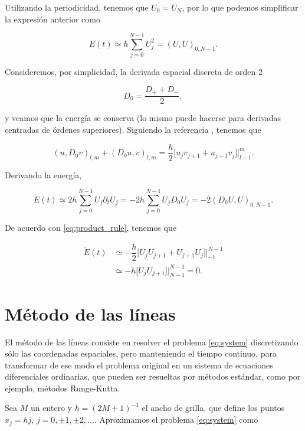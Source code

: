 \documentclass[12pt]{article}
\begin{document}
Utilizando la periodicidad, tenemos que $U_0 = U_N$, por lo que podemos simplificar la expresi\'on anterior como

\begin{equation}
E(t) \simeq h\sum_{j=0}^{N-1} U_j^2 = (U,U)_{0,N-1}.
\end{equation}

Consideremos, por simplicidad, la derivada espacial discreta de orden 2 

\begin{equation}
D_0 = \dfrac{D_+ + D_-}{2},
\end{equation}

y veamos que la energ\'ia se conserva (lo mismo puede hacerse para derivadas centradas de \'ordenes superiores). Siguiendo la referencia \cite{Kreiss-Ortiz}, tenemos que 

\begin{equation} \label{eq:product_rule}
(u, D_0 v)_{l,m} + (D_0 u, v)_{l,m} = \dfrac{h}{2} \bigg[ u_j v_{j+1} + u_{j+1} v_j \bigg]\bigg|_{l-1}^m.
\end{equation}

Derivando la energ\'ia,

\begin{equation}
\dot{E}(t) \simeq 2 h \sum_{j=0}^{N-1} U_j \partial_t U_j = -2 h \sum_{j=0}^{N-1} U_j D_0 U_j = -2 (D_0 U, U)_{0,N-1}.
\end{equation}

De acuerdo con \ref{eq:product_rule}, tenemos que 

\begin{align}
\dot{E}(t) &\simeq -\dfrac{h}{2}  \bigg[ U_j U_{j+1} + U_{j+1} U_j \bigg]\bigg|_{-1}^{N-1} \\
&\simeq -h   \bigg[ U_j U_{j+1}\bigg]\bigg|_{N-1}^{N-1} = 0.
\end{align}

\section{M\'etodo de las l\'ineas}

El m\'etodo de las l\'ineas consiste en resolver el problema \ref{eq:system} discretizando s\'olo las coordenadas espaciales, pero manteniendo el tiempo continuo, para transformar de ese modo el problema original en un sistema de ecuaciones diferenciales ordinarias, que pueden ser resueltas por m\'etodos est\'andar, como por ejemplo, m\'etodos Runge-Kutta.

Sea $M$ un entero y $h = (2 M +1)^{-1}$ el ancho de grilla, que define los puntos $x_j = hj$, $j=0,\pm 1,\pm 2, \dots$. Aproximamos el problema \ref{eq:system} como
\end{document}
